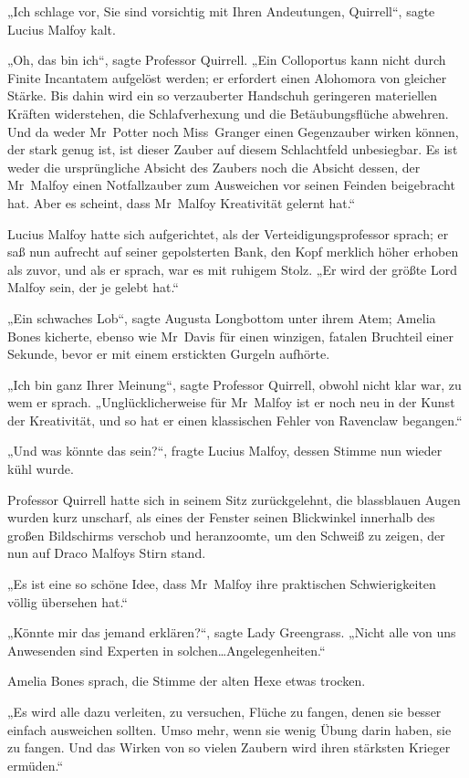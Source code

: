 {„Ich schlage vor, Sie sind vorsichtig mit Ihren Andeutungen, Quirrell“, sagte Lucius Malfoy kalt.

„Oh, das bin ich“, sagte Professor Quirrell. „Ein Colloportus kann nicht durch Finite Incantatem aufgelöst werden; er erfordert einen Alohomora von gleicher Stärke. Bis dahin wird ein so verzauberter Handschuh geringeren materiellen Kräften widerstehen, die Schlafverhexung und die Betäubungsflüche abwehren. Und da weder Mr~Potter noch Miss~Granger einen Gegenzauber wirken können, der stark genug ist, ist dieser Zauber auf diesem Schlachtfeld unbesiegbar. Es ist weder die ursprüngliche Absicht des Zaubers noch die Absicht dessen, der Mr~Malfoy einen Notfallzauber zum Ausweichen vor seinen Feinden beigebracht hat. Aber es scheint, dass Mr~Malfoy Kreativität gelernt hat.“

Lucius Malfoy hatte sich aufgerichtet, als der Verteidigungsprofessor sprach; er saß nun aufrecht auf seiner gepolsterten Bank, den Kopf merklich höher erhoben als zuvor, und als er sprach, war es mit ruhigem Stolz. „Er wird der größte Lord Malfoy sein, der je gelebt hat.“

„Ein schwaches Lob“, sagte Augusta Longbottom unter ihrem Atem; Amelia Bones kicherte, ebenso wie Mr~Davis für einen winzigen, fatalen Bruchteil einer Sekunde, bevor er mit einem erstickten Gurgeln aufhörte.

„Ich bin ganz Ihrer Meinung“, sagte Professor Quirrell, obwohl nicht klar war, zu wem er sprach. „Unglücklicherweise für Mr~Malfoy ist er noch neu in der Kunst der Kreativität, und so hat er einen klassischen Fehler von Ravenclaw begangen.“

„Und was könnte das sein?“, fragte Lucius Malfoy, dessen Stimme nun wieder kühl wurde.

Professor Quirrell hatte sich in seinem Sitz zurückgelehnt, die blassblauen Augen wurden kurz unscharf, als eines der Fenster seinen Blickwinkel innerhalb des großen Bildschirms verschob und heranzoomte, um den Schweiß zu zeigen, der nun auf Draco Malfoys Stirn stand.

„Es ist eine so schöne Idee, dass Mr~Malfoy ihre praktischen Schwierigkeiten völlig übersehen hat.“

„Könnte mir das jemand erklären?“, sagte Lady Greengrass. „Nicht alle von uns Anwesenden sind Experten in solchen…Angelegenheiten.“

Amelia Bones sprach, die Stimme der alten Hexe etwas trocken.

„Es wird alle dazu verleiten, zu versuchen, Flüche zu fangen, denen sie besser einfach ausweichen sollten. Umso mehr, wenn sie wenig Übung darin haben, sie zu fangen. Und das Wirken von so vielen Zaubern wird ihren stärksten Krieger ermüden.“

}
